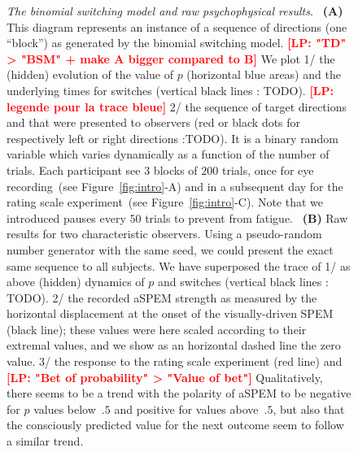 \documentclass[12pt,english]{article}%
\newcommand{\seeFig}[1]{Figure~\ref{fig:#1}}
\newcommand{\LP}[1]{\textbf{\textcolor{red}{[LP: #1]}}}
\begin{document}
\begin{figure}%
\caption{
\emph{The binomial switching model and raw psychophysical results.}%
~\textbf{(A)}
This diagram represents an instance of a sequence of directions (one ``block'')
as generated by the binomial switching model. %
\LP{"TD" > "BSM" + make A bigger compared to B}
We plot 
1/ the (hidden) evolution of the value of $p$ (horizontal blue areas)
and the underlying times for switches (vertical black lines : TODO).
\LP{legende pour la trace bleue}
2/ the sequence of target directions
and that were presented to observers
(red or black dots for respectively left or right directions :TODO).
It is a binary random variable which varies dynamically
as a function of the number of trials.
Each participant see 3 blocks of $200$ trials,
once for eye recording~(see \seeFig{intro}-A)
and in a subsequent day for the rating scale experiment~(see \seeFig{intro}-C).
Note that we introduced pauses every $50$ trials to prevent from fatigue.
~\textbf{(B)} Raw results for two characteristic observers.
Using a pseudo-random number generator with the same seed,
we could present the exact same sequence to all subjects. %
We have superposed the trace of
1/ as above (hidden) dynamics of $p$ and switches (vertical black lines : TODO).
2/ the recorded aSPEM strength as measured by the horizontal displacement
at the onset of the visually-driven SPEM (black line);
these values were here scaled according to their extremal values,
and we show as an horizontal dashed line the zero value. 
3/ the response to the rating scale experiment (red line) and
\LP{"Bet of probability" > "Value of bet"}
Qualitatively, there seems to be a trend with the polarity of aSPEM
to be negative for $p$ values below~$.5$ and positive for values above~$.5$,
but also that the consciously predicted value
for the next outcome
seem to follow a similar trend.
}
\label{fig:results_raw}
\end{figure}
\end{document}
